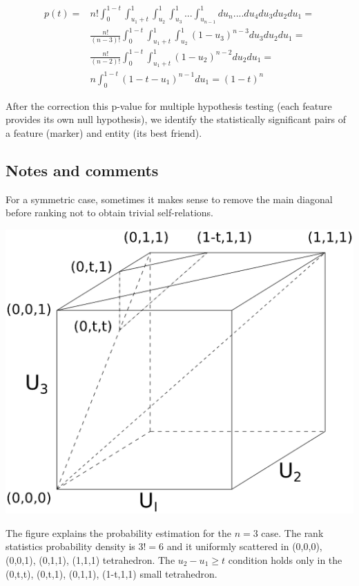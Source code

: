 \documentclass{llncs}
\begin{document}
\begin{eqnarray*}
p(t) = & n!\displaystyle \int_0^{1-t}\int_{{u_1}+t}^1\int_{u_2}^1\int_{u_3}^1...\int_{u_{n-1}}^1 du_n....du_4 du_3 du_2 du_1 = \\ 
&\displaystyle \frac{n!}{(n-3)!}\int_0^{1-t}\int_{{u_1}+t}^1\int_{u_2}^1 \left( 1-u_3 \right)^{n-3}du_3 du_2 du_1 = \\
&\displaystyle \frac{n!}{(n-2)!}\int_0^{1-t}\int_{{u_1}+t}^1\left( 1-u_2 \right)^{n-2} du_2 du_1 = \\
&\displaystyle n \int_0^{1-t}\left( 1-t-u_1 \right)^{n-1} du_1 = (1-t)^n
\end{eqnarray*}

After the correction this p-value for multiple hypothesis testing (each feature provides its own null hypothesis), we identify the statistically significant pairs of a feature (marker) and entity (its best friend). 

\subsection*{Notes and comments}

For a symmetric case, sometimes it makes sense to remove the main diagonal before ranking not to obtain trivial self-relations.

\includegraphics[scale=.5,trim=0 10cm 0 0, clip=true]{rank3d-nocolour}

The figure explains the probability estimation for the $n=3$ case. The rank statistics probability density is $3!=6$ and it uniformly scattered in (0,0,0), (0,0,1), (0,1,1), (1,1,1) tetrahedron. The $u_2 - u_1 \ge t$ condition holds only in the (0,t,t), (0,t,1), (0,1,1), (1-t,1,1) small tetrahedron.
\end{document}
